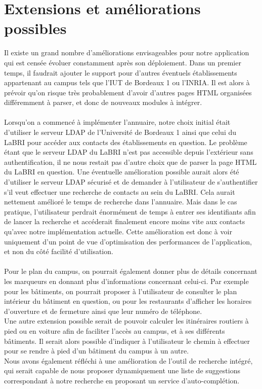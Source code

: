 \chapter{Extensions et améliorations possibles}
Il existe un grand nombre d’améliorations envisageables pour notre application qui est censée évoluer constamment après son déploiement.
Dans un premier temps, il faudrait ajouter le support pour d’autres éventuels établissements appartenant au campus tels que l’IUT de Bordeaux 1 ou l’INRIA. 
Il est alors à prévoir qu’on risque très probablement d’avoir d’autres pages HTML organisées différemment à parser, et donc de nouveaux modules à intégrer.\\\\
 
Lorsqu’on a commencé à implémenter l’annuaire, notre choix initial était d’utiliser le serveur LDAP de l’Université de Bordeaux 1 ainsi que celui du LaBRI pour accéder aux contacts des établissements en question. Le problème étant que le serveur LDAP du LaBRI n’est pas accessible depuis l’extérieur sans authentification, il ne nous restait pas d’autre choix que de parser la page HTML du LaBRI en question. Une éventuelle amélioration possible aurait alors été d’utiliser le serveur LDAP sécurisé et de demander à l’utilisateur de s’authentifier s'il veut effectuer une recherche de contacts au sein du LaBRI. Cela aurait nettement amélioré le temps de recherche dans l’annuaire. Mais dans le cas pratique, l’utilisateur perdrait énormément de temps à entrer ses identifiants afin de lancer la recherche et accéderait finalement encore moins vite aux contacts qu’avec notre implémentation actuelle. Cette amélioration est donc à voir uniquement d’un point de vue d’optimisation des  performances de l’application, et non du côté facilité d’utilisation.\\\\

Pour le plan du campus, on pourrait également donner plus de détails concernant les marqueurs en donnant plus d’informations concernant celui-ci. Par exemple pour les bâtiments, on pourrait proposer à l’utilisateur de consulter le plan intérieur du bâtiment en question, ou pour les restaurants d’afficher les horaires d’ouverture et de fermeture ainsi que leur numéro de téléphone.\\
Une autre extension possible serait de pouvoir calculer les itinéraires routiers à pied ou en voiture afin de faciliter l’accès au campus, et à ses différents bâtiments. Il serait alors possible d’indiquer à l’utilisateur le chemin à effectuer pour se rendre à pied d’un bâtiment du campus à un autre.\\
Nous avons également réfléchi à une amélioration de l’outil de recherche intégré, qui serait capable de nous proposer dynamiquement une liste de suggestions correspondant à notre recherche en proposant un service d'auto-complétion.\\\\

